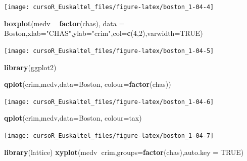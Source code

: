 \documentclass[]{book}
\newenvironment{Shaded}{\begin{snugshade}}{\end{snugshade}}
\newcommand{\KeywordTok}[1]{\textcolor[rgb]{0.13,0.29,0.53}{\textbf{#1}}}
\newcommand{\DataTypeTok}[1]{\textcolor[rgb]{0.13,0.29,0.53}{#1}}
\newcommand{\DecValTok}[1]{\textcolor[rgb]{0.00,0.00,0.81}{#1}}
\newcommand{\StringTok}[1]{\textcolor[rgb]{0.31,0.60,0.02}{#1}}
\newcommand{\OtherTok}[1]{\textcolor[rgb]{0.56,0.35,0.01}{#1}}
\newcommand{\OperatorTok}[1]{\textcolor[rgb]{0.81,0.36,0.00}{\textbf{#1}}}
\newcommand{\NormalTok}[1]{#1}
\begin{document}
\begin{center}\texttt{[image: cursoR\_Euskaltel\_files/figure-latex/boston\_1-04-4]} \end{center}

\begin{Shaded}
\begin{Highlighting}[]
\KeywordTok{boxplot}\NormalTok{(medv }\OperatorTok{~}\StringTok{ }\KeywordTok{factor}\NormalTok{(chas), }\DataTypeTok{data =}\NormalTok{ Boston,}\DataTypeTok{xlab=}\StringTok{"CHAS"}\NormalTok{,}\DataTypeTok{ylab=}\StringTok{"crim"}\NormalTok{,}\DataTypeTok{col=}\KeywordTok{c}\NormalTok{(}\DecValTok{4}\NormalTok{,}\DecValTok{2}\NormalTok{),}\DataTypeTok{varwidth=}\OtherTok{TRUE}\NormalTok{)}
\end{Highlighting}
\end{Shaded}

\begin{center}\texttt{[image: cursoR\_Euskaltel\_files/figure-latex/boston\_1-04-5]} \end{center}

\begin{Shaded}
\begin{Highlighting}[]
\KeywordTok{library}\NormalTok{(ggplot2)}

\KeywordTok{qplot}\NormalTok{(crim,medv,}\DataTypeTok{data=}\NormalTok{Boston, }\DataTypeTok{colour=}\KeywordTok{factor}\NormalTok{(chas))}
\end{Highlighting}
\end{Shaded}

\begin{center}\texttt{[image: cursoR\_Euskaltel\_files/figure-latex/boston\_1-04-6]} \end{center}

\begin{Shaded}
\begin{Highlighting}[]
\KeywordTok{qplot}\NormalTok{(crim,medv,}\DataTypeTok{data=}\NormalTok{Boston, }\DataTypeTok{colour=}\NormalTok{tax)}
\end{Highlighting}
\end{Shaded}

\begin{center}\texttt{[image: cursoR\_Euskaltel\_files/figure-latex/boston\_1-04-7]} \end{center}

\begin{Shaded}
\begin{Highlighting}[]
\KeywordTok{library}\NormalTok{(lattice)}
\KeywordTok{xyplot}\NormalTok{(medv}\OperatorTok{~}\NormalTok{crim,}\DataTypeTok{groups=}\KeywordTok{factor}\NormalTok{(chas),}\DataTypeTok{auto.key =} \OtherTok{TRUE}\NormalTok{)}
\end{Highlighting}
\end{Shaded}
\end{document}
